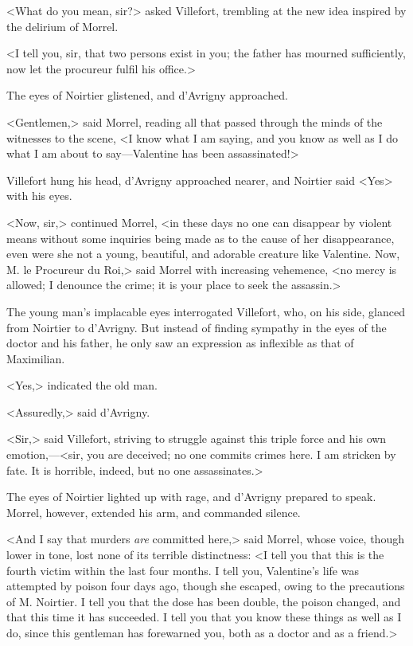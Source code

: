  <What do you mean, sir?> asked Villefort, trembling at the new idea inspired by the delirium of Morrel. 

 <I tell you, sir, that two persons exist in you; the father has mourned sufficiently, now let the procureur fulfil his office.> 

 The eyes of Noirtier glistened, and d'Avrigny approached. 

 <Gentlemen,> said Morrel, reading all that passed through the minds of the witnesses to the scene, <I know what I am saying, and you know as well as I do what I am about to say—Valentine has been assassinated!> 

 Villefort hung his head, d'Avrigny approached nearer, and Noirtier said <Yes> with his eyes. 

 <Now, sir,> continued Morrel, <in these days no one can disappear by violent means without some inquiries being made as to the cause of her disappearance, even were she not a young, beautiful, and adorable creature like Valentine. Now, M. le Procureur du Roi,> said Morrel with increasing vehemence, <no mercy is allowed; I denounce the crime; it is your place to seek the assassin.> 

 The young man's implacable eyes interrogated Villefort, who, on his side, glanced from Noirtier to d'Avrigny. But instead of finding sympathy in the eyes of the doctor and his father, he only saw an expression as inflexible as that of Maximilian. 

 <Yes,> indicated the old man. 

 <Assuredly,> said d'Avrigny. 

 <Sir,> said Villefort, striving to struggle against this triple force and his own emotion,—<sir, you are deceived; no one commits crimes here. I am stricken by fate. It is horrible, indeed, but no one assassinates.> 

 The eyes of Noirtier lighted up with rage, and d'Avrigny prepared to speak. Morrel, however, extended his arm, and commanded silence. 

 <And I say that murders \textit{are} committed here,> said Morrel, whose voice, though lower in tone, lost none of its terrible distinctness: <I tell you that this is the fourth victim within the last four months. I tell you, Valentine's life was attempted by poison four days ago, though she escaped, owing to the precautions of M. Noirtier. I tell you that the dose has been double, the poison changed, and that this time it has succeeded. I tell you that you know these things as well as I do, since this gentleman has forewarned you, both as a doctor and as a friend.> 


